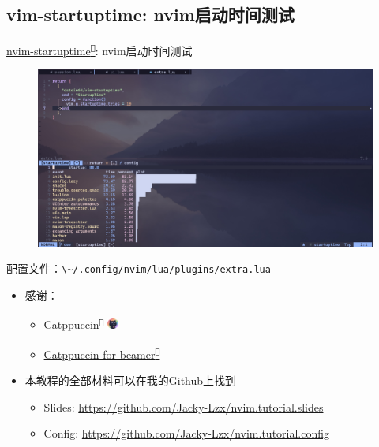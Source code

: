 \documentclass[aspectratio=169]{ctexbeamer}
\newcommand{\nerd}[1]{\texttt{#1}}
\newcommand{\link}[3][]{\href{#3}{#2\textsuperscript{\nerd{}}}}
\begin{document}
\subsection{vim-startuptime: nvim启动时间测试}
\begin{frame}{\link{nvim-startuptime}{https://github.com/dstein64/vim-startuptime}: nvim启动时间测试}
  \begin{figure}[H]
    \centering
    \includegraphics[width=0.65\linewidth]{./Figures/StartupTime_Finish.jpg}
  \end{figure}
  配置文件：\lstinline[language={},style=path]{\~/.config/nvim/lua/plugins/extra.lua}
\end{frame}

\begin{frame}
  \begin{itemize}
    \item 感谢：
      \begin{itemize}
        \item \link{Catppuccin}{https://catppuccin.com/} \includegraphics[height=10pt]{./Figures/Catppuccin_logo.png}
        \item \link{Catppuccin for beamer}{https://github.com/atticus-sullivan/beamercolortheme}
      \end{itemize}
      \vspace{0.5cm}
    \item 本教程的全部材料可以在我的Github上找到
      \begin{itemize}
        \item Slides: \url{https://github.com/Jacky-Lzx/nvim.tutorial.slides}
        \item Config: \url{https://github.com/Jacky-Lzx/nvim.tutorial.config}
      \end{itemize}
  \end{itemize}
\end{frame}
\end{document}

